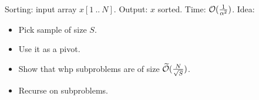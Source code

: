 \documentclass[12pt]{uebung}
\begin{document}
\begin{aufg}[2 pts.]
Sorting: input array $x[1\ ..\ N]$. Output: $x$ sorted. Time: $\mathcal{O}(\frac{1}{\alpha^2})$. Idea:
\begin{itemize}
\item Pick sample of size $S$. 
\item Use it as a pivot. 
\item Show that whp subproblems are of size $\widetilde{\mathcal{O}}(\frac{N}{\sqrt{S}})$.
\item Recurse on subproblems.
\end{itemize}
\end{aufg}
\end{document}
